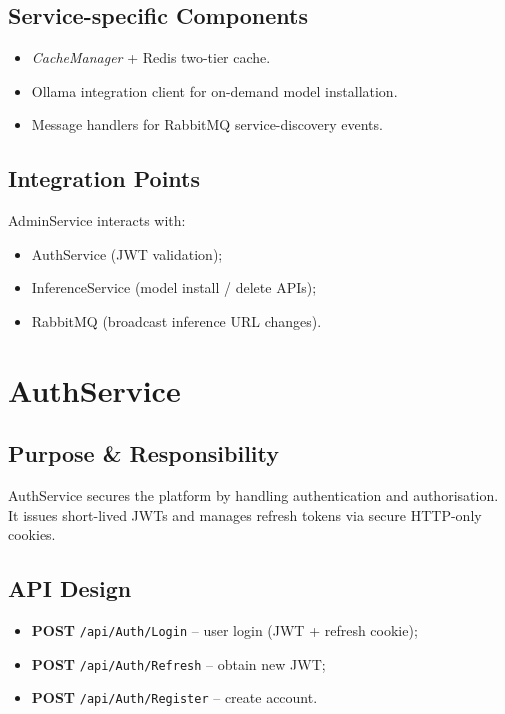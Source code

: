 \subsection{Service-specific Components}
\begin{itemize}
  \item \emph{CacheManager} + Redis two-tier cache.
  \item Ollama integration client for on-demand model installation.
  \item Message handlers for RabbitMQ service-discovery events.
\end{itemize}

\subsection{Integration Points}
AdminService interacts with:
\begin{itemize}
  \item AuthService (JWT validation);
  \item InferenceService (model install / delete APIs);
  \item RabbitMQ (broadcast inference URL changes).
\end{itemize}

\section{AuthService}
\subsection{Purpose \& Responsibility}
AuthService secures the platform by handling authentication and authorisation.  It issues short-lived JWTs and manages refresh tokens via secure HTTP-only cookies.

\subsection{API Design}
\begin{itemize}
  \item \textbf{POST} \texttt{/api/Auth/Login} – user login (JWT + refresh cookie);
  \item \textbf{POST} \texttt{/api/Auth/Refresh} – obtain new JWT;
  \item \textbf{POST} \texttt{/api/Auth/Register} – create account.
\end{itemize}

